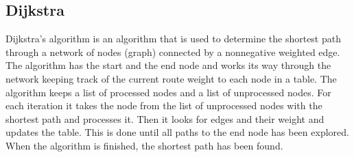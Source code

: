 \subsection{Dijkstra}
Dijkstra's algorithm is an algorithm that is used to determine the shortest path through a network of nodes (graph) connected by a nonnegative weighted edge. The algorithm has the start and the end node and works its way through the network keeping track of the current route weight to each node in a table. The algorithm keeps a list of processed nodes and a list of unprocessed nodes. For each iteration it takes the node from the list of unprocessed nodes with the shortest path and processes it. Then it looks for edges and their weight and updates the table. This is done until all paths to the end node has been explored. When the algorithm is finished, the shortest path has been found.